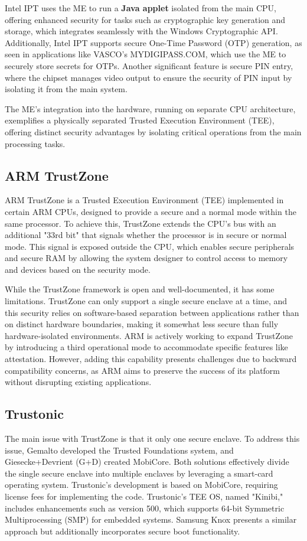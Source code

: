 Intel IPT uses the ME to run a \textbf{Java applet} isolated from the
main CPU, offering enhanced security for tasks such as cryptographic
key generation and storage, which integrates seamlessly with the
Windows Cryptographic API. Additionally, Intel IPT supports secure
One-Time Password (OTP) generation, as seen in applications like
VASCO's MYDIGIPASS.COM, which use the ME to securely store secrets for
OTPs. Another significant feature is secure PIN entry, where the
chipset manages video output to ensure the security of PIN input by
isolating it from the main system.

The ME's integration into the hardware, running on separate CPU
architecture, exemplifies a physically separated Trusted Execution
Environment (TEE), offering distinct security advantages by isolating
critical operations from the main processing tasks.

\subsection{ARM TrustZone}

ARM TrustZone is a Trusted Execution Environment (TEE) implemented in
certain ARM CPUs, designed to provide a secure and a normal mode
within the same processor. To achieve this, TrustZone extends the
CPU's bus with an additional "33rd bit" that signals whether the
processor is in secure or normal mode. This signal is exposed outside
the CPU, which enables secure peripherals and secure RAM by allowing
the system designer to control access to memory and devices based on
the security mode.

While the TrustZone framework is open and well-documented, it has some
limitations. TrustZone can only support a single secure enclave at a
time, and this security relies on software-based separation between
applications rather than on distinct hardware boundaries, making it
somewhat less secure than fully hardware-isolated environments. ARM is
actively working to expand TrustZone by introducing a third
operational mode to accommodate specific features like attestation.
However, adding this capability presents challenges due to backward
compatibility concerns, as ARM aims to preserve the success of its
platform without disrupting existing applications.

\subsection{Trustonic}

The main issue with TrustZone is that it only one secure enclave. 
To address this issue, Gemalto developed the Trusted Foundations 
system, and Giesecke+Devrient (G+D) created MobiCore. 
Both solutions effectively divide the single secure enclave into 
multiple enclaves by leveraging a smart-card operating system. 
Trustonic’s development is based on MobiCore, requiring 
license fees for implementing the code. Trustonic's TEE OS, 
named "Kinibi," includes enhancements such as version 500, 
which supports 64-bit Symmetric Multiprocessing (SMP) for 
embedded systems. Samsung Knox presents a similar approach 
but additionally incorporates secure boot functionality.

